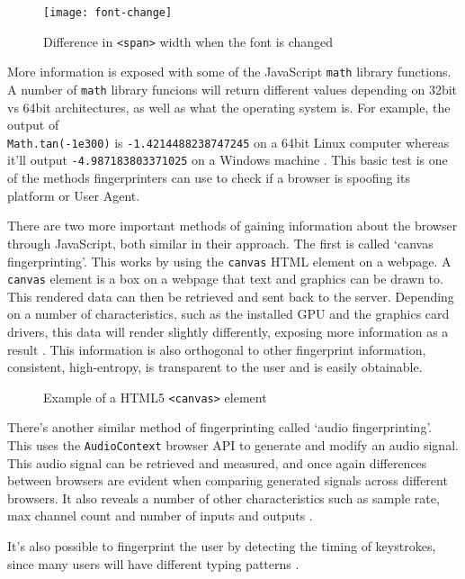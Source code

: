 \begin{figure}[h]
\texttt{[image: font-change]}
\centering
\caption{Difference in \texttt{<span>} width when the font is changed}
\label{fig:font-change}
\end{figure}

More information is exposed with some of the JavaScript \texttt{math} library functions.
A number of \texttt{math} library funcions will return different values depending on 32bit vs 64bit architectures, as well as what the operating system is.
For example, the output of \\
\texttt{Math.tan(-1e300)} is \texttt{-1.4214488238747245} on a 64bit Linux computer whereas it'll output \texttt{-4.987183803371025} on a Windows machine \citep{floating-point-bug}.
This basic test is one of the methods fingerprinters can use to check if a browser is spoofing its platform or User Agent.

There are two more important methods of gaining information about the browser through JavaScript, both similar in their approach.
The first is called `canvas fingerprinting'.
This works by using the \texttt{canvas} HTML element on a webpage.
A \texttt{canvas} element is a box on a webpage that text and graphics can be drawn to.
This rendered data can then be retrieved and sent back to the server.
Depending on a number of characteristics, such as the installed GPU and the graphics card drivers, this data will render slightly differently, exposing more information as a result \citep{canvas-fingerprint}.
This information is also orthogonal to other fingerprint information, consistent, high-entropy, is transparent to the user and is easily obtainable.

\begin{figure}[h]
\centering
\label{fig:canvas-example}
\caption{Example of a HTML5 \texttt{<canvas>} element}
\end{figure}

There's another similar method of fingerprinting called `audio fingerprinting'.
This uses the \texttt{AudioContext} browser API to generate and modify an audio signal.
This audio signal can be retrieved and measured, and once again differences between browsers are evident when comparing generated signals across different browsers.
It also reveals a number of other characteristics such as sample rate, max channel count and number of inputs and outputs \citep{audio-fingerprint}.

It's also possible to fingerprint the user by detecting the timing of keystrokes, since many users will have different typing patterns \citep{keystrokes}.

